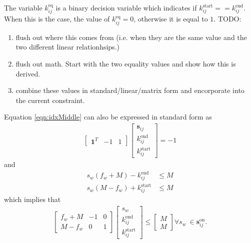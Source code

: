 The variable $k_{ij}^{\text{eq}}$ is a binary decision variable which indicates if $k_{ij}^{\text{start}} == k_{ij}^{\text{end}}$.  When this is the case, the value of $k_{ij}^{\text{eq}} = 0$, otherwise it is equal to $1$. 
TODO:
\begin{enumerate}
	\item flush out where this comes from (i.e. when they are the same value and the two different linear relationhsips.)
	\item flush out math.  Start with the two equality values and show how this is derived. 
	\item combine these values in standard/linear/matrix form and encorporate into the current constraint.
\end{enumerate}
Equation \ref{eqn:idxMiddle} can also be expressed in standard form as
\begin{equation} \begin{aligned}
	\begin{bmatrix}\mathbf{1}^T & - 1 & 1 \end{bmatrix} \begin{bmatrix}\mathbf{s}_{ij} \\ k_{ij}^{\text{end}} \\ k_{ij}^{\text{start}} \end{bmatrix} = -1
\end{aligned} \end{equation}
and
\begin{equation}\begin{aligned}
	s_w\left (f_w + M \right) - k_{ij}^{\text{end}} &\le M \\
	s_w\left (M - f_w\right) + k_{ij}^{\text{start}} &\le M 
\end{aligned}\end{equation}
which implies that
\begin{equation} \begin{aligned}
	\begin{bmatrix}f_w + M & -1 & 0\\
		       M - f_w & 0 & 1 
	\end{bmatrix} 
	\begin{bmatrix}s_w                 \\
		       k_{ij}^{\text{end}} \\ 
		       k_{ij}^{\text{start}}
	\end{bmatrix} \le
	\begin{bmatrix} M \\
	                M 
	\end{bmatrix} \forall s_w \ \in \mathbf{s}_{ij}^{\text{on}}.
\end{aligned}\end{equation}

